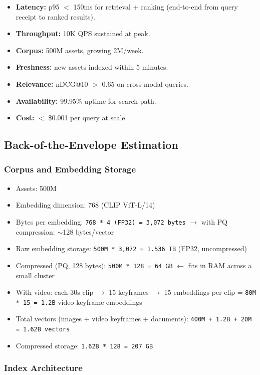 \begin{itemize}
  \item \textbf{Latency:} p95 $<$ 150ms for retrieval + ranking (end-to-end from query receipt to ranked results).
  \item \textbf{Throughput:} 10K QPS sustained at peak.
  \item \textbf{Corpus:} 500M assets, growing 2M/week.
  \item \textbf{Freshness:} new assets indexed within 5 minutes.
  \item \textbf{Relevance:} nDCG@10 $>$ 0.65 on cross-modal queries.
  \item \textbf{Availability:} 99.95\% uptime for search path.
  \item \textbf{Cost:} $<$ \$0.001 per query at scale.
\end{itemize}

\subsection*{Back-of-the-Envelope Estimation}

\subsubsection*{Corpus and Embedding Storage}

\begin{itemize}
  \item Assets: 500M
  \item Embedding dimension: 768 (CLIP ViT-L/14)
  \item Bytes per embedding: \texttt{768 * 4 (FP32) = 3,072 bytes} $\rightarrow$ with PQ compression: $\sim$128 bytes/vector
  \item Raw embedding storage: \texttt{500M * 3,072 = 1.536 TB} (FP32, uncompressed)
  \item Compressed (PQ, 128 bytes): \texttt{500M * 128 = 64 GB} $\leftarrow$ fits in RAM across a small cluster
  \item With video: each 30s clip $\rightarrow$ 15 keyframes $\rightarrow$ 15 embeddings per clip = \texttt{80M * 15 = 1.2B} video keyframe embeddings
  \item Total vectors (images + video keyframes + documents): \texttt{400M + 1.2B + 20M = 1.62B vectors}
  \item Compressed storage: \texttt{1.62B * 128 = 207 GB}
\end{itemize}

\subsubsection*{Index Architecture}


